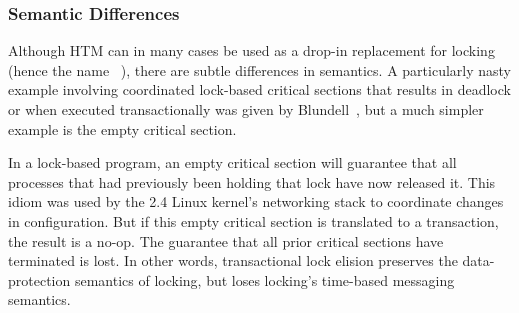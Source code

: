 \subsubsection{Semantic Differences}
\label{sec:future:Semantic Differences}

Although HTM can in many cases be used as a drop-in replacement for locking
(hence the name ~\cite{DaveDice2008TransactLockElision}),
there are subtle differences in semantics.
A particularly nasty example involving coordinated lock-based critical
sections that results in deadlock or  when executed transactionally
was given by Blundell~\cite{Blundell2006TMdeadlock}, but a much simpler
example is the empty critical section.

In a lock-based program, an empty critical section will guarantee
that all processes that had previously been holding that lock have
now released it.
This idiom was used by the 2.4 Linux kernel's networking stack to
coordinate changes in configuration.
But if this empty critical section is translated to a transaction,
the result is a no-op.
The guarantee that all prior critical sections have terminated is
lost.
In other words, transactional lock elision preserves the data-protection
semantics of locking, but loses locking's time-based messaging semantics.

